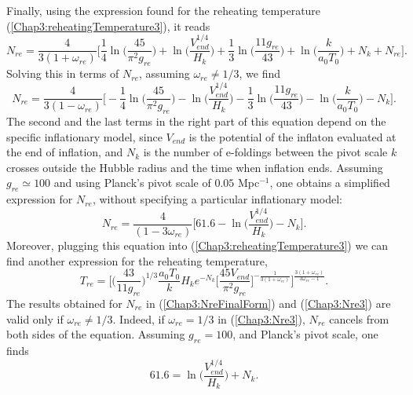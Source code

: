 \documentclass[11pt,a4paper,twoside]{book}
\begin{document}
Finally, using the expression found for the reheating temperature (\ref{Chap3:reheatingTemperature3}), it reads
\begin{equation}
\label{Nre3}
N_{re}=\frac{4}{3(1+\omega_{re})}\Bigg[  \frac{1}{4} \ln \Bigg(\frac{45}{\pi^{2} g_{re}}\Bigg)   + \ln \Bigg(\frac{V_{end}^{1/4}}{H_{k}}\Bigg) +  \frac{1}{3}\ln \Bigg(\frac{11 g_{re}}{43}\Bigg) + \ln \Bigg(\frac{k}{a_{0}T_{0}}\Bigg) + N_{k} + N_{re}    \Bigg].
\end{equation}
Solving this in terms of $ N_{re} $, assuming $ \omega_{re} \ne 1/3 $, we find
\begin{equation}
	\label{Chap3:Nre3}
	N_{re}=\frac{4}{3(1-\omega_{re})}\Bigg[ - \frac{1}{4} \ln \Bigg(\frac{45}{\pi^{2} g_{re}}\Bigg)   - \ln \Bigg(\frac{V_{end}^{1/4}}{H_{k}}\Bigg) -  \frac{1}{3}\ln \Bigg(\frac{11 g_{re}}{43}\Bigg) - \ln \Bigg(\frac{k}{a_{0}T_{0}}\Bigg) - N_{k}     \Bigg].
\end{equation}
The second and the last terms in the right part of this equation depend on the specific inflationary model, since $ V_{end} $ is the potential of the inflaton evaluated at the end of inflation, and $ N_{k} $ is the number of e-foldings between the pivot scale $ k $ crosses outside the Hubble radius and the time when inflation ends. Assuming $ g_{re} \simeq 100 $ and using Planck's pivot scale of $ 0.05 $ Mpc$^{-1}$, one obtains a simplified expression for $ N_{re} $, without specifying a particular inflationary model:
\begin{equation}
	\label{Chap3:NreFinalForm}
	N_{re}=\frac{4}{(1-3\omega_{re})}\Bigg[61.6 - \ln \Bigg( \frac{V_{end}^{1/4}}{H_{k}}\Bigg) - N_{k}     \Bigg].
\end{equation}
Moreover, plugging this equation into (\ref{Chap3:reheatingTemperature3}) we can find another expression for the reheating temperature,
\begin{equation}	
T_{re} = \Bigg[\Bigg(\frac{43}{11g_{re}}\Bigg)^{1/3}\frac{a_{0}T_{0}}{k}H_{k}e^{-N_{k}}\Big[\dfrac{45 V_{end}}{\pi^{2}g_{re}}\Big]^{-\frac{1}{3(1+\omega_{re})}}\Bigg]^{\frac{3(1+\omega_{re})}{3\omega_{re}-1}}.	
\end{equation}
The results obtained for $ N_{re} $ in (\ref{Chap3:NreFinalForm}) and (\ref{Chap3:Nre3}) are valid only if $\omega_{re} \ne 1/3$. Indeed, if $\omega_{re}=1/3$ in  (\ref{Chap3:Nre3}), $ N_{re} $ cancels from both sides of the equation. Assuming $ g_{re} = 100 $, and Planck's pivot scale, one finds \cite{Chap3:Cook}
\begin{equation}
	61.6 = \ln \Bigg( \frac{V_{end}^{1/4}}{H_{k}}\Bigg) + N_{k}.
\end{equation}
\end{document}
